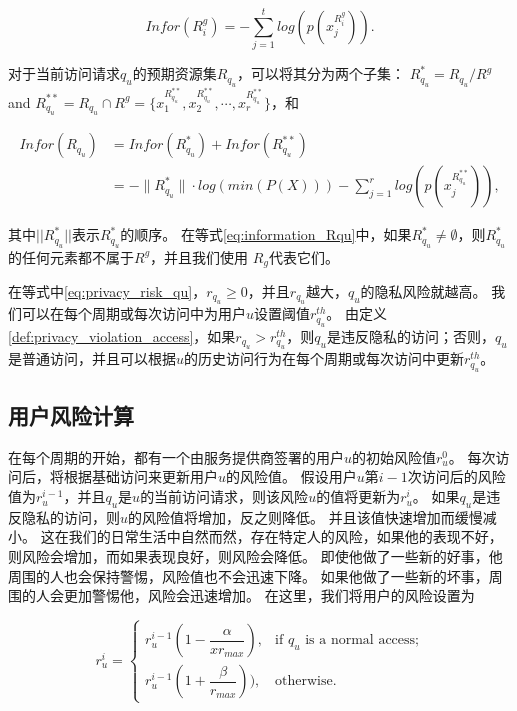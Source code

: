 \begin{equation}\label{eq:information_Rgi}
Infor(R^g_i)=-\sum_{j=1}^t log(p(x_j^{R^g_i})).
\end{equation}


对于当前访问请求$q_u$的预期资源集$R_{q_u}$，可以将其分为两个子集： $R_{q_u}^* = R_{q_u}/R^g$ and $R_{q_u}^{**} = R_{q_u} \cap R^g = \{x_1^{R_{q_u}^{**}},x_2^{R_{q_u}^{**}},\cdots, x_r^{R_{q_u}^{**}}\}$，和

\begin{equation}\label{eq:information_Rqu}
\begin{split}
Infor(R_{q_u})&=Infor(R_{q_u}^{*})  +Infor(R_{q_u}^{**})
\\&=-\|R_{q_u}^*\|\cdot log(min(P(X)))-\sum_{j=1}^r log(p(x_j^{R_{q_u}^{**}})),
\end{split}
\end{equation}

其中$||R_{q_u}^*||$表示$R_{q_u}^*$的顺序。 在等式\ref{eq:information_Rqu}中，如果$R_{q_u}^* \neq \emptyset$，则$R_{q_u}^*$的任何元素都不属于$R^g$，并且我们使用 $R_g$代表它们。

在等式中\ref{eq:privacy_risk_qu}，$r_{q_u} \geq 0$，并且$r_{q_u}$越大，$q_u$的隐私风险就越高。 我们可以在每个周期或每次访问中为用户$u$设置阈值$r_{q_u}^{th}$。 由定义\ref{def:privacy_violation_access}，如果$r_{q_u} > r_{q_u}^{th}$，则$q_u$是违反隐私的访问；否则，$q_u$是普通访问，并且可以根据$u$的历史访问行为在每个周期或每次访问中更新$r_{q_u}^{th}$。

\subsection{用户风险计算}

在每个周期的开始，都有一个由服务提供商签署的用户${u}$的初始风险值${r_u ^ 0}$。 每次访问后，将根据基础访问来更新用户${u}$的风险值。 假设用户${u}$第${{i-1}}$次访问后的风险值为${r_u ^ {i-1}}$，并且${q_u}$是${u}$的当前访问请求，则该风险$ {u}$的值将更新为${r_u ^ {i}}$。 如果${q_u}$是违反隐私的访问，则${u}$的风险值将增加，反之则降低。 并且该值快速增加而缓慢减小。 这在我们的日常生活中自然而然，存在特定人的风险，如果他的表现不好，则风险会增加，而如果表现良好，则风险会降低。 即使他做了一些新的好事，他周围的人也会保持警惕，风险值也不会迅速下降。 如果他做了一些新的坏事，周围的人会更加警惕他，风险会迅速增加。 在这里，我们将用户的风险设置为

\begin{equation}\label{eq:userrisk}
r_u^{i}=\left\{ 
\begin{array}{cl}
r_u^{i-1}(1-\dfrac{\alpha}{xr_{max}}), & \text{if } q_u \text{ is a normal access;}\\
r_u^{i-1}(1+\dfrac{\beta}{r_{max}})), & \text{otherwise.}
\end{array}
\right.
\end{equation}

